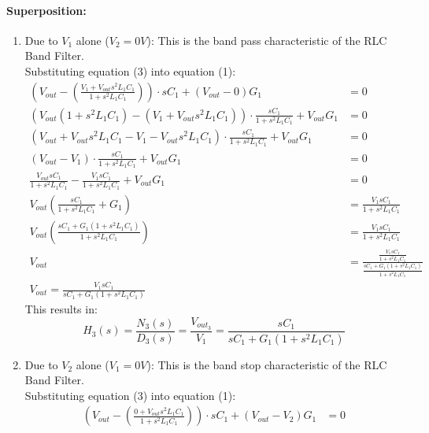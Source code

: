\begin{enumerate}
    \paragraph{Superposition:}
      \begin{enumerate}
        \item Due to \(V_{1}\) alone (\(V_{2} = 0V\)):
          This is the band pass characteristic of the RLC Band Filter.\\
          Substituting equation (3) into equation (1):
          \begin{align*}
            \left(V_{out} - \left(\frac{V_{1} + V_{out}s^2 L_1 C_1}{1 + s^2 L_1 C_1}\right)\right) \cdot sC_1 + (V_{out} - 0){G_1} &= 0 \\
            \left(V_{out}(1 + s^2 L_1 C_1) - (V_{1} + V_{out}s^2 L_1 C_1)\right) \cdot \frac{sC_1}{1 + s^2 L_1 C_1} + V_{out}G_1 &= 0 \\
            \left(V_{out} + V_{out}s^2 L_1 C_1 - V_{1} - V_{out}s^2 L_1 C_1\right) \cdot \frac{sC_1}{1 + s^2 L_1 C_1} + V_{out}G_1 &= 0 \\
            \left(V_{out} - V_{1}\right) \cdot \frac{sC_1}{1 + s^2 L_1 C_1} + V_{out}G_1 &= 0 \\
            \frac{V_{out} sC_1}{1 + s^2 L_1 C_1} - \frac{V_{1} sC_1}{1 + s^2 L_1 C_1} + V_{out}G_1 &= 0 \\
            V_{out}\left(\frac{sC_1}{1 + s^2 L_1 C_1} + G_1\right) &= \frac{V_{1} sC_1}{1 + s^2 L_1 C_1} \\
            V_{out}\left(\frac{sC_1 + G_1(1 + s^2 L_1 C_1)}{1 + s^2 L_1 C_1}\right) &= \frac{V_{1} sC_1}{1 + s^2 L_1 C_1} \\
            V_{out} &= \frac{\frac{V_{1} sC_1}{1 + s^2 L_1 C_1}}{\frac{sC_1 + G_1(1 + s^2 L_1 C_1)}{1 + s^2 L_1 C_1}} \\
            V_{out} = \frac{V_{1} sC_1}{sC_1 + G_1(1 + s^2 L_1 C_1)}
          \end{align*}
          This results in:
          \[
            H_3(s) = \frac{N_3(s)}{D_3(s)} = \frac{V_{out_3}}{V_{1}} = \frac{sC_1}{sC_1 + G_1(1 + s^2 L_1 C_1)}
          \]
        \item Due to \(V_{2}\) alone (\(V_{1} = 0V\)):
          This is the band stop characteristic of the RLC Band Filter.\\
          Substituting equation (3) into equation (1):
          \begin{align*}
            \left(V_{out} - \left(\frac{0 + V_{out}s^2 L_1 C_1}{1 + s^2 L_1 C_1}\right)\right) \cdot sC_1 + (V_{out} - V_{2}){G_1} &= 0 \\

\end{align*}
\end{enumerate}
\end{enumerate}
